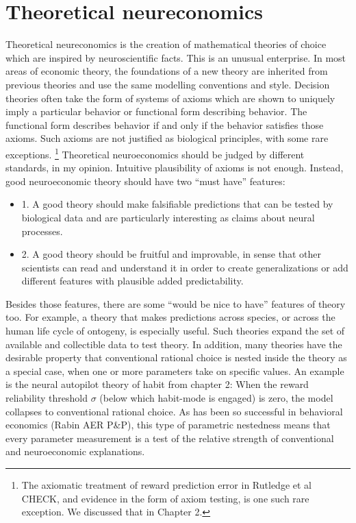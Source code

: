 \documentclass{article}
\begin{document}
\section{Theoretical neureconomics}
Theoretical neureconomics is the creation of mathematical theories of choice which are inspired by neuroscientific facts. This is an unusual enterprise. In most areas of economic theory, the foundations of a new theory are inherited from previous theories and use the same modelling conventions and style. Decision theories often take the form of systems of axioms which are shown to uniquely imply a particular behavior or functional form describing behavior. The functional form describes behavior if and only if the behavior satisfies those axioms. Such axioms are not justified as biological principles, with some rare exceptions. \footnote{The axiomatic treatment of reward prediction error in Rutledge et al CHECK, and evidence in the form of axiom testing, is one such rare exception. We discussed that in Chapter 2.}
Theoretical neuroeconomics should be judged by different standards, in my opinion. Intuitive plausibility of axioms is not enough. Instead, good neuroeconomic theory should have two “must have” features:
\begin{itemize}
	\item 1.	A good theory should make falsifiable predictions that can be tested by biological data and are particularly interesting as claims about neural processes. 
\item 2.	A good theory should be fruitful and improvable, in sense that other scientists can read and understand it in order to create generalizations or add different features with plausible added predictability. 
\end{itemize} 
Besides those features, there are some “would be nice to have” features of theory too. For example, a theory that makes predictions across species, or across the human life cycle of ontogeny, is especially useful. Such theories expand the set of available and collectible data to test theory.
In addition, many theories have the desirable property that conventional rational choice is nested inside the theory as a special case, when one or more parameters take on specific values. An example is the neural autopilot theory of habit from chapter 2: When the reward reliability threshold $\sigma$ (below which habit-mode is engaged) is zero, the model collapses to conventional rational choice. As has been so successful in behavioral economics (Rabin AER P\&P), this type of parametric nestedness means that every parameter measurement is a test of the relative strength of conventional and neuroeconomic explanations. 
\end{document}
